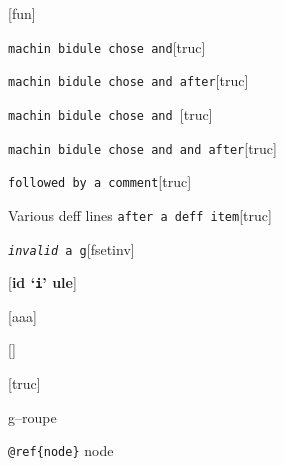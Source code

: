 \documentclass{book}
\begin{document}
\begin{titlepage}
\noindent\texttt\bgroup{}\egroup{}\hfill[fun]



\noindent\texttt\bgroup{}machin bidule chose and\egroup{}\hfill[truc]



%
\noindent\texttt\bgroup{}machin bidule chose and  after\egroup{}\hfill[truc]



%
\noindent\texttt\bgroup{}machin bidule chose and \egroup{}\hfill[truc]



%
\noindent\texttt\bgroup{}machin bidule chose and and after\egroup{}\hfill[truc]



%
\noindent\texttt\bgroup{}followed by a comment\egroup{}\hfill[truc]



%
Various deff lines
\noindent\texttt\bgroup{}after a deff item\egroup{}\hfill[truc]



%

\noindent\texttt\bgroup{}\emph{invalid} a g\egroup{}\hfill[fsetinv]



%
\noindent\texttt\bgroup{}\egroup{}\hfill[\textbf{id `\texttt{i}' ule}]




\noindent\texttt\bgroup{}\egroup{}\hfill[aaa]



\noindent\texttt\bgroup{}\egroup{}\hfill[]



\noindent\texttt\bgroup{}\egroup{}\hfill[truc]




g--roupe

\texttt{@ref\{node\}} node


\end{titlepage}
\end{document}
